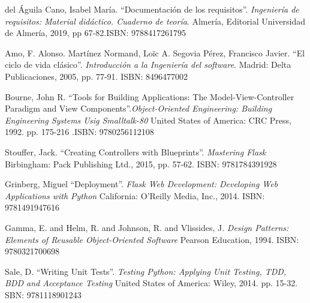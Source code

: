 \documentclass[11pt,spanish,listoffigures,listoftables]{tfgetsinf}
\begin{document}
\begin{thebibliography}{10}



	del Águila Cano, Isabel María.
	\newblock ``Documentación de los requisitos''. \textit{Ingeniería de requisitos: Material didáctico. Cuaderno de teoría}.
	\newblock Almería, Editorial Universidad de Almería, 2019, pp 67-82.ISBN: 9788417261795

	Amo, F. Alonso. Martínez Normand, Loïc A. Segovia Pérez, Francisco Javier.
	\newblock ``El ciclo de vida clásico''. \textit{Introducción a la Ingeniería del software}.
	\newblock Madrid: Delta Publicaciones, 2005, pp. 77-91. ISBN: 8496477002
	
	Bourne, John R.
	\newblock ``Tools for Building Applications: The Model-View-Controller Paradigm and View Components''.\textit{Object-Oriented Engineering: Building Engineering Systems Usig Smalltalk-80}
	\newblock United States of America: CRC Press, 1992. pp. 175-216 .ISBN: 9780256112108
	
	Stouffer, Jack.
	\newblock ``Creating Controllers with Blueprints''. \textit{Mastering Flask}
	\newblock Birbingham: Pack Publishing Ltd., 2015, pp. 57-62. ISBN: 9781784391928
	
	
	Grinberg, Miguel
	\newblock ``Deployment''. \textit{Flask Web Development: Developing Web Applications with Python}
	\newblock California: O'Reilly Media, Inc., 2014. ISBN: 9781491947616
	
	Gamma, E. and Helm, R. and Johnson, R. and Vlissides, J.
	\newblock \textit{Design Patterns: Elements of Reusable Object-Oriented Software}
	\newblock Pearson Education, 1994. ISBN: 9780321700698
	
	Sale, D.
	\newblock ``Writing Unit Tests''. \textit{Testing Python: Applying Unit Testing, TDD, BDD and Acceptance Testing}
	\newblock United States of America: Wiley, 2014. pp. 15-32. SBN: 9781118901243



\end{thebibliography}
\end{document}
